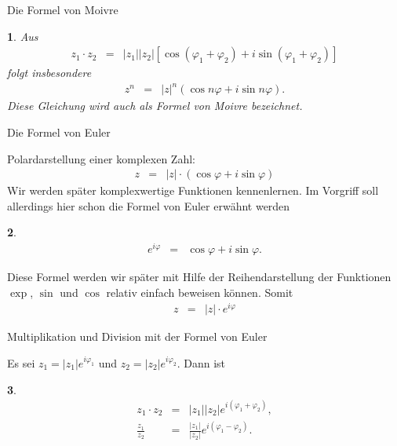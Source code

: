 \documentclass[german]{beamer}
\newcommand{\bq}{\begin{eqnarray*}}
\newcommand{\eq}{\end{eqnarray*}}
\newtheorem*{myemptytheorem}{}
\begin{document}
\begin{frame}{Die Formel von Moivre}

\begin{myemptytheorem}
Aus
\bq
 z_1 \cdot z_2 & = & \left| z_1 \right| \left| z_2 \right|
   \left[ \cos\left(\varphi_1+\varphi_2\right) + i \sin\left(\varphi_1+\varphi_2\right) \right]
\eq
folgt insbesondere
\bq
 z^n & = & \left| z \right|^n \left( \cos n \varphi + i \sin n \varphi \right).
\eq
Diese Gleichung wird auch als Formel von Moivre bezeichnet.
\end{myemptytheorem}


\end{frame}

\begin{frame}{Die Formel von Euler}

Polardarstellung einer komplexen Zahl:
\bq
 z & = & \left| z \right| \cdot \left( \cos \varphi + i \sin \varphi \right)
\eq
Wir werden sp\"ater komplexwertige Funktionen kennenlernen. Im Vorgriff soll allerdings hier schon die Formel von Euler erw\"ahnt werden
\begin{myemptytheorem}
\bq
 e^{i \varphi} & = & \cos \varphi + i \sin \varphi.
\eq
\end{myemptytheorem}
Diese Formel werden wir sp\"ater mit Hilfe der Reihendarstellung der Funktionen $\exp$, $\sin$ und $\cos$ relativ einfach beweisen k\"onnen.
Somit
\bq
 z & = & \left| z \right| \cdot e^{i \varphi}
\eq

\end{frame}

\begin{frame}{Multiplikation und Division mit der Formel von Euler}

Es sei $z_1=|z_1| e^{i \varphi_1}$ und $z_2=|z_2| e^{i \varphi_2}$.
Dann ist
\begin{myemptytheorem}
\bq
 z_1 \cdot z_2 & = & 
  \left| z_1 \right| \left| z_2 \right| e^{i \left(\varphi_1+\varphi_2\right)},
 \nonumber \\
 \frac{z_1}{z_2} & = & \frac{\left| z_1 \right|}{\left| z_2 \right|} e^{i \left(\varphi_1-\varphi_2\right)}.
\eq
\end{myemptytheorem}


\end{frame}
\end{document}
